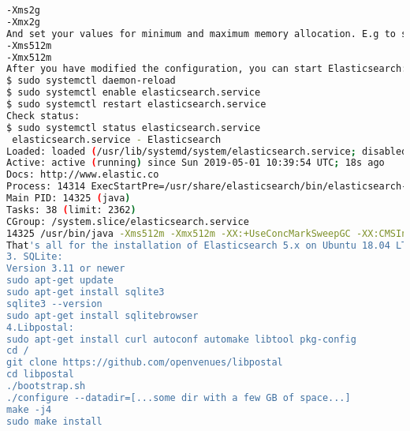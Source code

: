 \begin{lstlisting}[language=bash,breaklines=true]
-Xms2g
-Xmx2g
And set your values for minimum and maximum memory allocation. E.g to set values to 512mb of ram, use:
-Xms512m
-Xmx512m
After you have modified the configuration, you can start Elasticsearch:
$ sudo systemctl daemon-reload
$ sudo systemctl enable elasticsearch.service
$ sudo systemctl restart elasticsearch.service
Check status:
$ sudo systemctl status elasticsearch.service 
 elasticsearch.service - Elasticsearch
Loaded: loaded (/usr/lib/systemd/system/elasticsearch.service; disabled; vendor preset: enabled)
Active: active (running) since Sun 2019-05-01 10:39:54 UTC; 18s ago
Docs: http://www.elastic.co
Process: 14314 ExecStartPre=/usr/share/elasticsearch/bin/elasticsearch-systemd-pre-exec (code=exited, status=0/SUCCESS)
Main PID: 14325 (java)
Tasks: 38 (limit: 2362)
CGroup: /system.slice/elasticsearch.service
14325 /usr/bin/java -Xms512m -Xmx512m -XX:+UseConcMarkSweepGC -XX:CMSInitiatingOccupancyFraction=75 -XX:+UseCMSInitiatingOccupancyOnly -X
That's all for the installation of Elasticsearch 5.x on Ubuntu 18.04 LTS (Bionic Beaver) Linux.
3. SQLite:
Version 3.11 or newer
sudo apt-get update
sudo apt-get install sqlite3
sqlite3 --version
sudo apt-get install sqlitebrowser
4.Libpostal: 
sudo apt-get install curl autoconf automake libtool pkg-config
cd /
git clone https://github.com/openvenues/libpostal
cd libpostal
./bootstrap.sh
./configure --datadir=[...some dir with a few GB of space...]
make -j4
sudo make install


\end{lstlisting}

